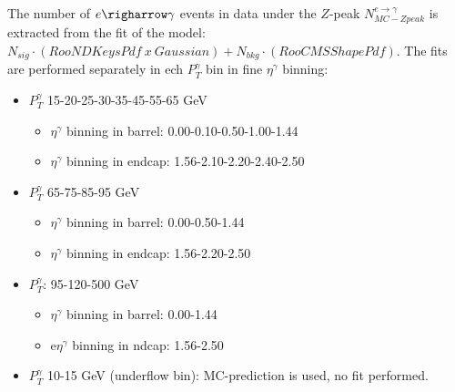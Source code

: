 The number of $e\righarrow\gamma$ events in data under the $Z$-peak $N_{MC-Zpeak}^{e\rightarrow\gamma}$ is extracted from the fit of the model: $N_{sig} \cdot (RooNDKeysPdf~x~Gaussian) +  N_{bkg} \cdot (RooCMSShapePdf)$. The fits are performed separately in ech $P_T^\gamma$ bin in fine $\eta^\gamma$ binning:
     \begin{itemize}
        \item $P_T^\gamma$ 15-20-25-30-35-45-55-65 GeV
           \begin{itemize}
              \item $\eta^\gamma$ binning in barrel: 0.00-0.10-0.50-1.00-1.44
              \item $\eta^\gamma$ binning in endcap: 1.56-2.10-2.20-2.40-2.50
           \end{itemize}
        \item $P_T^\gamma$ 65-75-85-95 GeV
          \begin{itemize}
              \item $\eta^\gamma$ binning in barrel: 0.00-0.50-1.44
              \item $\eta^\gamma$ binning in endcap: 1.56-2.20-2.50
           \end{itemize}
        \item $P_T^\gamma$: 95-120-500 GeV
          \begin{itemize}
              \item $\eta^\gamma$ binning in barrel: 0.00-1.44
              \item e$\eta^\gamma$ binning in ndcap: 1.56-2.50
           \end{itemize}
        \item $P_T^\gamma$ 10-15 GeV (underflow bin): MC-prediction is used, no fit performed.
     \end{itemize}








